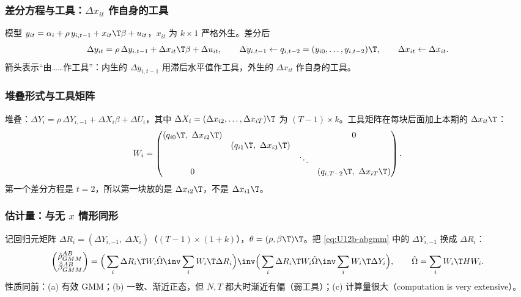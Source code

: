 \subsubsection{差分方程与工具：\texorpdfstring{$\Delta x_{it}$}{Delta x} 作自身的工具}

模型 $y_{it}=\alpha_i+\rho\,y_{i,t-1}+x_{it}\T\beta+u_{it}$，$x_{it}$ 为 $k\times1$ 严格外生。差分后
\[
\Delta y_{it}=\rho\,\Delta y_{i,t-1}+\Delta x_{it}\T\beta+\Delta u_{it},\qquad
\Delta y_{i,t-1}\leftarrow q_{i,t-2}=(y_{i0},\dots,y_{i,t-2})\T,\qquad
\Delta x_{it}\leftarrow\Delta x_{it}.
\]
箭头表示“由……作工具”：内生的 $\Delta y_{i,t-1}$ 用滞后水平值作工具，外生的 $\Delta x_{it}$ 作自身的工具。

\subsubsection{堆叠形式与工具矩阵}

堆叠：$\Delta Y_i=\rho\,\Delta Y_{i,-1}+\Delta X_i\beta+\Delta U_i$，其中 $\Delta X_i=(\Delta x_{i2},\dots,\Delta x_{iT})\T$ 为 $(T-1)\times k$。工具矩阵在每块后面加上本期的 $\Delta x_{it}\T$：
\[
W_i=\begin{pmatrix} (q_{i0}\T,\ \Delta x_{i2}\T) & & & 0\\ & (q_{i1}\T,\ \Delta x_{i3}\T) & & \\ & & \ddots & \\ 0 & & & (q_{i,T-2}\T,\ \Delta x_{iT}\T)\end{pmatrix}.
\]
第一个差分方程是 $t=2$，所以第一块放的是 $\Delta x_{i2}\T$，不是 $\Delta x_{i1}\T$。

\subsubsection{估计量：与无 \texorpdfstring{$x$}{x} 情形同形}

记回归元矩阵 $\Delta R_i=(\Delta Y_{i,-1},\ \Delta X_i)$（$(T-1)\times(1+k)$），$\theta=(\rho,\beta\T)\T$。把 \eqref{eq:U12b-abgmm} 中的 $\Delta Y_{i,-1}$ 换成 $\Delta R_i$：
\[
\begin{pmatrix}\hat\rho^{AB}_{GMM}\\ \hat\beta^{AB}_{GMM}\end{pmatrix}
=\Big(\sum_i\Delta R_i\T W_i\hat\Omega\inv\sum_iW_i\T\Delta R_i\Big)\inv\Big(\sum_i\Delta R_i\T W_i\hat\Omega\inv\sum_iW_i\T\Delta Y_i\Big),\qquad \hat\Omega=\sum_iW_i\T HW_i .
\]
性质同前：(a) 有效 GMM；(b) 一致、渐近正态，但 $N,T$ 都大时渐近有偏（弱工具）；(c) 计算量很大（computation is very extensive）。

